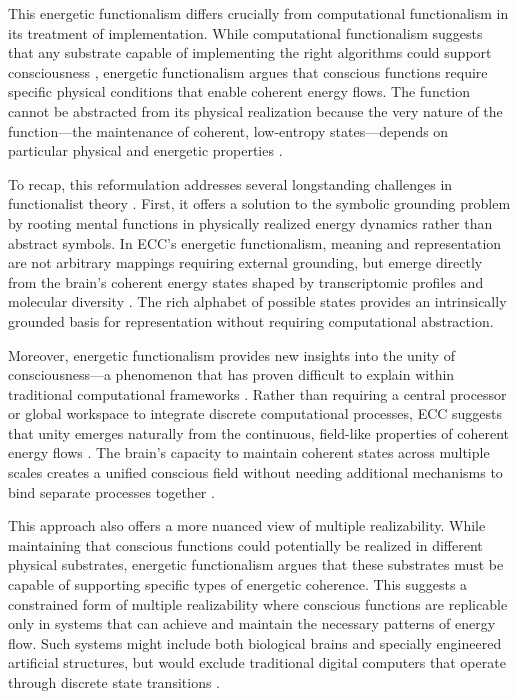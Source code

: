 This energetic functionalism differs crucially from computational functionalism in its treatment of implementation. While computational functionalism suggests that any substrate capable of implementing the right algorithms could support consciousness \cite{wheeler2010defense}, energetic functionalism argues that conscious functions require specific physical conditions that enable coherent energy flows. The function cannot be abstracted from its physical realization because the very nature of the function—the maintenance of coherent, low-entropy states—depends on particular physical and energetic properties \cite{nicholson2018everything,whitehead2010process}.

To recap, this reformulation addresses several longstanding challenges in functionalist theory \cite{polger2016multiple}. First, it offers a solution to the symbolic grounding problem by rooting mental functions in physically realized energy dynamics rather than abstract symbols. In ECC's energetic functionalism, meaning and representation are not arbitrary mappings requiring external grounding, but emerge directly from the brain's coherent energy states shaped by transcriptomic profiles and molecular diversity \cite{gillett2016reduction}. The rich alphabet of possible states provides an intrinsically grounded basis for representation without requiring computational abstraction.

Moreover, energetic functionalism provides new insights into the unity of consciousness—a phenomenon that has proven difficult to explain within traditional computational frameworks \cite{van1998dynamical}. Rather than requiring a central processor or global workspace \cite{Baars2013} to integrate discrete computational processes, ECC suggests that unity emerges naturally from the continuous, field-like properties of coherent energy flows \cite{McFadden2020}. The brain's capacity to maintain coherent states across multiple scales creates a unified conscious field without needing additional mechanisms to bind separate processes together \cite{thompson2011living}.

This approach also offers a more nuanced view of multiple realizability. While maintaining that conscious functions could potentially be realized in different physical substrates, energetic functionalism argues that these substrates must be capable of supporting specific types of energetic coherence. This suggests a constrained form of multiple realizability where conscious functions are replicable only in systems that can achieve and maintain the necessary patterns of energy flow. Such systems might include both biological brains and specially engineered artificial structures, but would exclude traditional digital computers that operate through discrete state transitions \cite{wheeler2010defense}.

